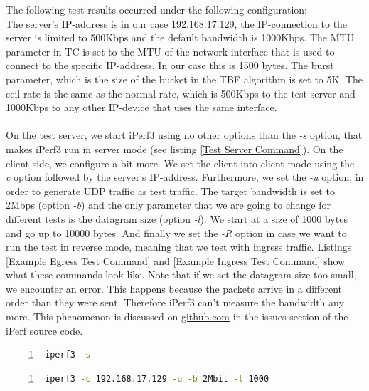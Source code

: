 The following test results occurred under the following configuration:
\\
The server's \acs{IP}-address is in our case 192.168.17.129, the \acs{IP}-connection to the server is limited to 500Kbps and the default bandwidth is 1000Kbps. The \ac{MTU} parameter in \acs{TC} is set to the \acs{MTU} of the network interface that is used to connect to the specific \acs{IP}-address. In our case this is 1500 bytes. The burst parameter, which is the size of the bucket in the \acs{TBF} algorithm is set to 5K. The ceil rate is the same as the normal rate, which is 500Kbps to the test server and 1000Kbps to any other \acs{IP}-device that uses the same interface.
\\
\\
On the test server, we start iPerf3 using no other options than the \textit{-s} option, that makes iPerf3 run in server mode (see listing \ref{Test Server Command}). On the client side, we configure a bit more. We set the client into client mode using the \textit{-c} option followed by the server's \acs{IP}-address. Furthermore, we set the \textit{-u} option, in order to generate \acs{UDP} traffic as test traffic. The target bandwidth is set to 2Mbps (option \textit{-b}) and the only parameter that we are going to change for different tests is the datagram size (option \textit{-l}). We start at a size of 1000 bytes and go up to 10000 bytes. And finally we set the \textit{-R} option in case we want to run the test in reverse mode, meaning that we test with ingress traffic. Listings \ref{Example Egress Test Command} and \ref{Example Ingress Test Command} show what these commands look like. Note that if we set the datagram size too small, we encounter an error. This happens because the packets arrive in a different order than they were sent. Therefore iPerf3 can't measure the bandwidth any more. This phenomenon is discussed on \href{https://github.com/esnet/iperf/issues/457}{github.com}\cite{mah2016iperfIssue} in the issues section of the iPerf source code.

\newpage

\begin{lstlisting}[language=sh, caption = Test Server Command, captionpos=b, numbers=left, frame=single, breaklines=true, breakatwhitespace=true, showstringspaces=false, label=Test Server Command]
iperf3 -s
\end{lstlisting}

\begin{lstlisting}[language=sh, caption = Example Egress Test Command, captionpos=b, numbers=left, frame=single, breaklines=true, breakatwhitespace=true, showstringspaces=false, label=Example Egress Test Command]
iperf3 -c 192.168.17.129 -u -b 2Mbit -l 1000
\end{lstlisting}

